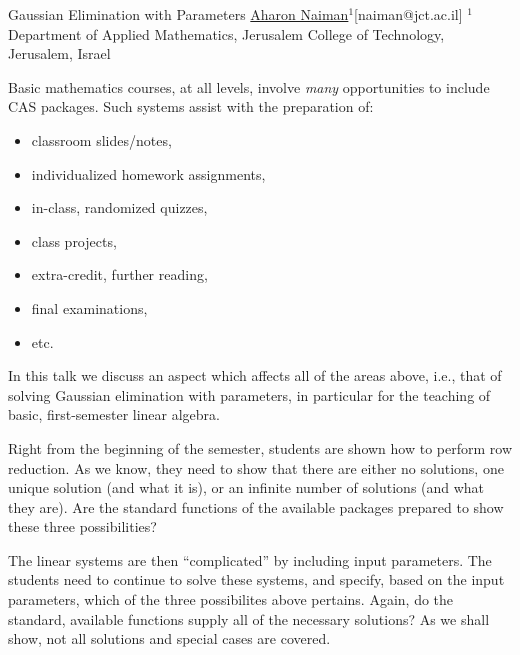 


\begin{abstract_online}{Gaussian Elimination with Parameters}{%
        \underline{Aharon Naiman}$^{1}$}{[naiman@jct.ac.il]
        }{%
        $^1$ Department of Applied Mathematics, Jerusalem College of
    Technology, Jerusalem, Israel}
    
Basic mathematics courses, at all levels, involve \textit{many}
opportunities to include CAS packages.
Such systems assist with the preparation of:
%
\begin{itemize}
    \item classroom slides/notes,
    \item individualized homework assignments,
    \item in-class, randomized quizzes,
    \item class projects,
    \item extra-credit, further reading,
    \item final examinations,
    \item etc.
\end{itemize}
%
In this talk we discuss an aspect which affects all of the areas
above, i.e., that of solving Gaussian elimination with parameters, in
particular for the teaching of basic, first-semester linear algebra.

Right from the beginning of the semester, students are shown how to
perform row reduction.  As we know, they need to show that there are
either no solutions, one unique solution (and what it is), or an
infinite number of solutions (and what they are).  Are the standard
functions of the available packages prepared to show these three
possibilities?

The linear systems are then ``complicated'' by including input
parameters.  The students need to continue to solve these systems, and
specify, based on the input parameters, which of the three
possibilites above pertains.  Again, do the standard, available
functions supply all of the necessary solutions?  As we shall show,
not all solutions and special cases are covered.


\end{abstract_online}
